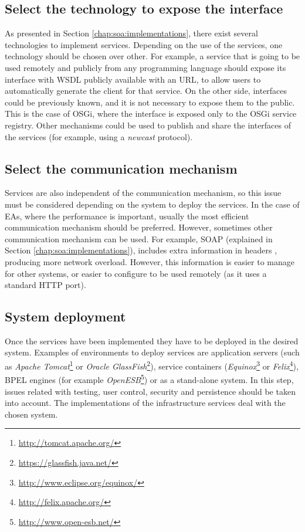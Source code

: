\subsection{Select the technology to expose the interface}
As presented in Section \ref{chap:soa:implementations}, there exist several technologies to implement services. Depending on the use of the services, one technology should be chosen over other. For example, a service that is going to be used remotely and publicly from any programming language should expose its interface with WSDL publicly available with an URL, to allow users to automatically generate the client for that service. On the other side, interfaces could be previously known, and it is not necessary to expose them to the public. This is the case of OSGi, where the interface is exposed only to the OSGi service registry. Other mechanisms could be used to publish and share the interfaces of the services (for example, using a {\em newcast} protocol).

\subsection{Select the communication mechanism}
Services are also independent of the communication mechanism, so this issue must be considered depending on the system to deploy the services. In the case of EAs, where the performance is important, usually the most efficient communication mechanism should be preferred. However, sometimes other communication mechanism can be used. For example, SOAP (explained in Section \ref{chap:soa:implementations}), includes extra information in headers \cite{Castillo13SOAP}, producing more network overload. However, this information is easier to manage for other systems, or easier to configure to be used remotely (as it uses a standard HTTP port).

\subsection{System deployment} 
Once the services have been implemented they have to be deployed in the desired system. Examples of environments to deploy services are application servers (such as {\em Apache Tomcat}\footnote{\url{http://tomcat.apache.org/}} or {\em Oracle GlassFish}\footnote{\url{https://glassfish.java.net/}}), service containers ({\em Equinox}\footnote{\url{http://www.eclipse.org/equinox/}} or {\em Felix}\footnote{\url{http://felix.apache.org/}}), BPEL engines (for example {\em OpenESB}\footnote{\url{http://www.open-esb.net/}}) or as a stand-alone system. In this step, issues related with testing, user control, security and persistence should be taken into account. The implementations of the infrastructure services deal with the chosen system.


